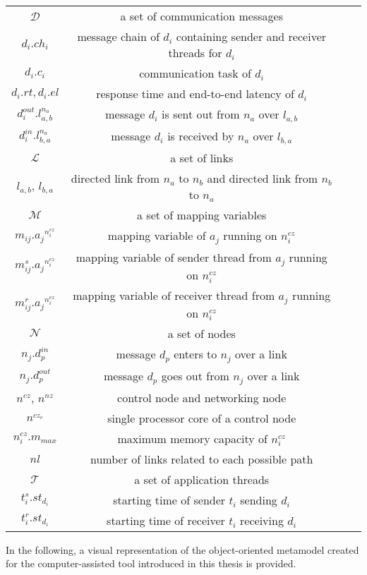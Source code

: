 \begin{longtable}{@{}c c c c@{}}
    			$\mathcal{D}$ & a set of communication messages\\[0.1cm]
    			$d_i.ch_i$ & message chain of $d_i$ containing sender and receiver threads for $d_i$\\[0.1cm]
    			$d_i.c_i$ & communication task of $d_i$\\[0.1cm]
    			$d_i.rt, d_i.el $ & response time and end-to-end latency of $d_i$ \\[0.1cm]		
    			$d_i^{out}.$$l_{a,b}^{n_a}$& message $d_i$ is sent out from $n_a$ over $l_{a,b}$\\[0.1cm]
    			$d_i^{in}.$$l_{b,a}^{n_a}$& message $d_i$ is received by $n_a$ over $l_{b,a}$\\[0.1cm]
    			$\mathcal{L}$ & a set of links\\[0.1cm]
    			$l_{a,b}$, $l_{b,a}$ &  directed link from $n_a$ to $n_b$ and directed link from $n_b$ to $n_a$\\[0.1cm]
    			$\mathcal{M}$ & a set of mapping variables\\[0.1cm]
    			${m_{ij}}.{a_j}^{n_{i}^{cz}}$ & mapping variable of $a_j$ running on $n_{i}^{cz}$ \\[0.1cm]
    			$m_{ij}^{s}.{a_j}^{n_i^{cz}}$ & mapping variable of sender thread from $a_j$ running on $n_{i}^{cz}$ \\[0.1cm]
    			$m_{ij}^{r}.{a_j}^{n_i^{cz}}$ & mapping variable of receiver thread from $a_j$ running on $n_{i}^{cz}$\\[0.1cm]
    			$\mathcal{N}$ & a set of nodes\\[0.1cm]
    			$n_{j}.d_p^{in}$& message $d_{p}$ enters to $n_{j}$ over a link\\[0.1cm]
    			$n_{j}.d_p^{out}$& message $d_{p}$ goes out from $n_{j}$ over a link\\[0.1cm]
    			$n^{cz}$, $n^{nz}$  & control node and networking node\\[0.1cm]
    			$n^{cz_c}$ & single processor core of a control node\\[0.1cm]
    			${n_i^{cz}}.m_{max}$ & maximum memory capacity of ${n_i^{cz}}$\\[0.1cm]
    			$nl$ & number of links related to each possible path \\[0.1cm]
    			$\mathcal{T}$ & a set of application threads\\[0.1cm]
    			$t_{i}^{s}.st_{d_i}$& starting time of sender $t_{i}$ sending $d_i$ \\[0.1cm]
    			$t_{i}^{r}.st_{d_i}$& starting time of receiver $t_{i}$ receiving $d_i$\\[0.1cm]
    			\bottomrule
\end{longtable}

    In the following, a visual representation of the object-oriented metamodel created for the computer-assisted tool introduced in this thesis is provided. 